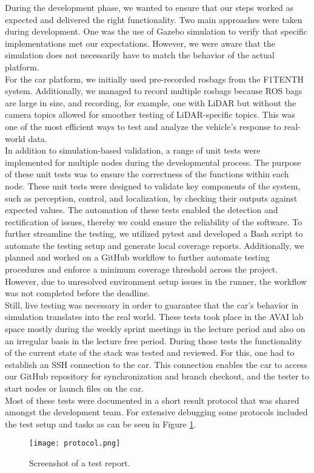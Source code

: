 During the development phase, we wanted to ensure that our steps worked as expected and delivered the right functionality. Two main approaches were taken during development. One was the use of Gazebo simulation to verify that specific implementations met our expectations. However, we were aware that the simulation does not necessarily have to match the behavior of the actual platform.\\
\newline
For the car platform, we initially used pre-recorded rosbags from the F1TENTH system. Additionally, we managed to record multiple rosbags because ROS bags are large in size, and recording, for example, one with LiDAR but without the camera topics allowed for smoother testing of LiDAR-specific topics. This was one of the most efficient ways to test and analyze the vehicle’s response to real-world data.\\
\newline
In addition to simulation-based validation, a range of unit tests were implemented for multiple nodes during the developmental process. The purpose of these unit tests was to ensure the correctness of the functions within each node. These unit tests were designed to validate key components of the system, such as perception, control, and localization, by checking their outputs against expected values. The automation of these tests enabled the detection and rectification of issues, thereby we could ensure the reliability of the software. To further streamline the testing, we utilized pytest and developed a Bash script to automate the testing setup and generate local coverage reports. Additionally, we planned and worked on a GitHub workflow to further automate testing procedures and enforce a minimum coverage threshold across the project. However, due to unresolved environment setup issues in the runner, the workflow was not completed before the deadline.\\
\newline
Still, live testing was necessary in order to guarantee that the car's behavior in simulation translates into the real world. These tests took place in the AVAI lab space mostly during the weekly sprint meetings in the lecture period and also on an irregular basis in the lecture free period. During those tests the functionality of the current state of the stack was tested and reviewed. For this, one had to establish an SSH connection to the car. This connection enables the car to access our GitHub repository for synchronization and branch checkout, and the tester to start nodes or launch files on the car. \\
\newline
Most of these tests were documented in a short result protocol that was shared amongst the development team. For extensive debugging some protocols included the test setup and tasks as can be seen in Figure \ref{fig:protocol}.

\begin{figure}[htp]
	\vskip 0.2in
	\begin{center}
		\centerline{\texttt{[image: protocol.png]}}
		\caption{Screenshot of a test report.}
		\label{fig:protocol}
	\end{center}
	\vskip -0.2in
\end{figure}
